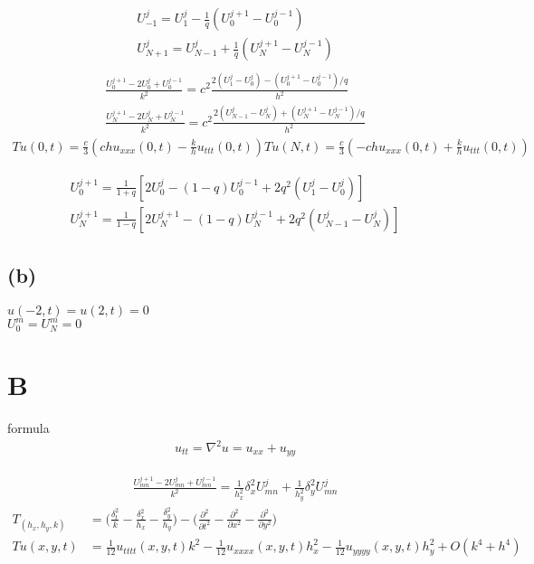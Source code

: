 \documentclass[en,hazy,screen,blue,normal]{elegantnote}
\begin{document}
\begin{align*}
    U_{-1}^{j} = U_1^j - \frac{1}{q} (U_0^{j+1}-U_0^{j-1}) \\
    U_{N+1}^{j} = U_{N-1}^j + \frac{1}{q} (U_N^{j+1}-U_N^{j-1}) \\
\end{align*}
\begin{align*}
    \frac{U_0^{j+1}-2U_0^j+U_0^{j-1}}{k^2} = c^2 \frac{2(U_1^j -U_0^j) -(U_0^{j+1} -U_0^{j-1})/q}{h^2} \\
    \frac{U_{N}^{j+1}-2U_N^j+U_N^{j-1}}{k^2} = c^2 \frac{2(U_{N-1}^j - U_N^j) + (U_N^{j+1} - U_N^{j-1})/q}{h^2}
\end{align*}
\begin{align*}
    Tu(0, t) = \frac{c}{3} (ch u_{xxx}(0, t) - \frac{k}{h}u_{ttt}(0, t))
    Tu(N, t) = \frac{c}{3} (-ch u_{xxx}(0, t) + \frac{k}{h}u_{ttt}(0, t))
\end{align*}

\begin{align*}
    U_0^{j+1} = \frac{1}{1+q} [2U_0^j -(1-q)U_0^{j-1} + 2q^2(U_1^j - U_0^j)] \\
    U_N^{j+1} = \frac{1}{1-q} [2U_N^{j+1} -(1-q)U_{N}^{j-1} + 2q^2 (U_{N-1}^j - U_{N}^j)]
\end{align*}

\subsection{(b)}
$u(-2, t) = u(2, t) = 0$ \\
$U_0^m = U_N^m = 0$


\section{B}
formula
\begin{align*}
    u_{tt} = \nabla^2 u = u_{xx} + u_{yy}
\end{align*}

\begin{align*}
    \frac{U_{mn}^{j+1}-2U_{mn}^{j}+U_{mn}^{j-1}}{k^2}
    = \frac{1}{h_x^2} \delta_{x}^2 U_{mn}^{j} + \frac{1}{h_y^2} \delta_{y}^2 U_{mn}^{j}
\end{align*}
\begin{align*}
    T_{(h_x, h_y, k)} &= \biggl(\frac{\delta_t^2}{k} - \frac{\delta_x^2}{h_x} - \frac{\delta_y^2}{h_y}\biggr) - \biggl(\frac{\partial^2}{\partial t^2} - \frac{\partial^2}{\partial x^2} - \frac{\partial^2}{\partial y^2}\biggr) \\
    Tu(x, y, t) &= \frac{1}{12} u_{tttt}(x, y, t) k^2 - \frac{1}{12} u_{xxxx}(x, y, t) h_x^2 - \frac{1}{12} u_{yyyy}(x, y, t) h_y^2  + O(k^4 + h^4)
\end{align*}
\end{document}
